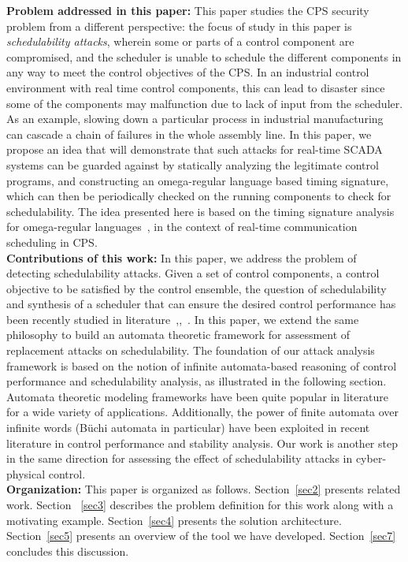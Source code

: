 \noindent
{\bf Problem addressed in this paper:} This paper studies the CPS security problem from a different perspective: the focus of study in this paper is {\em schedulability attacks}, wherein some or parts of a control component are compromised, and the scheduler is unable to schedule the different components in any way to meet the control objectives of the CPS.  In an industrial control environment with real time control components, this can lead to disaster since some of the components may malfunction due to lack of input from the scheduler. As an example, slowing down a
particular process in industrial manufacturing can cascade a chain of failures in the whole
assembly line. In this paper, we propose an idea that will demonstrate that such
attacks for real-time SCADA systems can be guarded against by statically analyzing the
legitimate control programs, and constructing an omega-regular language based timing signature,
which can then be periodically checked on the running components to check for schedulability. The idea presented here is based on the timing signature analysis for omega-regular languages~\cite{WeissFAA09}, in the context of real-time communication scheduling in CPS. \\

\noindent
{\bf Contributions of this work:}
In this paper, we address the problem of detecting schedulability attacks. Given a set of control components, a control objective 
to be satisfied by the control ensemble, the question of schedulability and 
synthesis of a scheduler that can ensure the desired control performance has been recently studied in literature~\cite{WeissFAA09},\cite{AlurW08},~\cite{GhoshMDHD16}. 
In this paper, we extend the same philosophy to build an automata theoretic framework for assessment of replacement attacks on schedulability. The foundation of our attack analysis framework is based on the notion of infinite automata-based reasoning of control performance and schedulability analysis, as illustrated in the following section. Automata theoretic modeling frameworks have been quite popular in literature for a wide variety of applications. Additionally, the power of finite automata over infinite words (B\"{u}chi automata in particular) have been exploited in recent literature in control performance and stability analysis. Our work is another step in the same direction for assessing the effect of schedulability attacks in cyber-physical control. \\


\noindent
{\bf Organization:} This paper is organized as follows. Section~\ref{sec2} presents related work. Section ~\ref{sec3} describes the problem definition for this work along with a motivating example. Section~\ref{sec4} presents the solution architecture. Section~\ref{sec5} presents an overview of the tool we have developed. Section~\ref{sec7} concludes this discussion.
